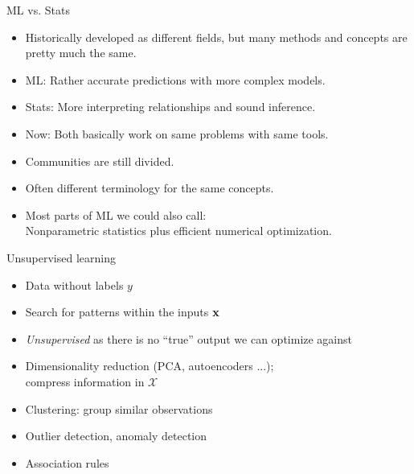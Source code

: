 \documentclass[11pt,compress,t,notes=noshow, xcolor=table]{beamer}
\begin{document}

\begin{frame}{ML vs. Stats}


\begin{itemize}
	\item Historically developed as different fields, but many
      methods and concepts are pretty much the same.
	\item ML: Rather accurate predictions with more complex models.
    \item Stats: More interpreting relationships and sound inference.
	\item Now: Both basically work on same problems with same tools.
    \item Communities are still divided.
    \item Often different terminology for the same concepts.
    \item Most parts of ML we could also call:\\Nonparametric statistics plus efficient numerical optimization.
\end{itemize}

\end{frame}


\begin{vbframe}{Unsupervised learning}
\begin{itemize}
  \item Data without labels $y$
  \item Search for patterns within the inputs $\mathbf{x}$
  \item \textit{Unsupervised} as there is no ``true'' output
      we can optimize against
\end{itemize}

\vspace{1em}

{
\vspace{2em}
\begin{itemize}
    \item Dimensionality reduction (PCA, autoencoders ...);\\ 
        compress information in $\mathcal X$
    \item Clustering: group similar observations
    \item Outlier detection, anomaly detection
    \item Association rules
\end{itemize}

}
\end{vbframe}
\end{document}
